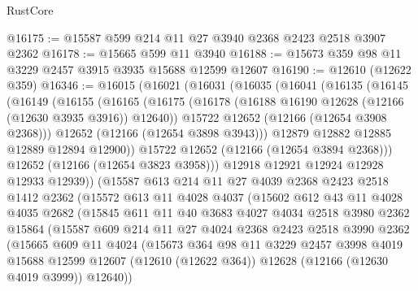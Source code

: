 \begin{lexlean}{RustCore}
\begin{coremodule}
@16175 := @15587 @599 @214 @11 @27 @3940 @2368 @2423 @2518 @3907 @2362
@16178 := @15665 @599 @11 @3940
@16188 := @15673 @359 @98 @11 @3229 @2457 @3915 @3935 @15688 @12599 @12607
@16190 := @12610 (@12622 @359)
@16346 := @16015
    (@16021
      (@16031
        (@16035
          (@16041
            (@16135
              (@16145
                (@16149
                  (@16155
                    (@16165
                      (@16175
                        (@16178 (@16188 @16190 @12628 (@12166 (@12630 @3935 @3916)) @12640))
                        @15722
                        @12652
                        (@12166 (@12654 @3908 @2368)))
                      @12652
                      (@12166 (@12654 @3898 @3943)))
                    @12879
                    @12882
                    @12885
                    @12889
                    @12894
                    @12900))
                @15722
                @12652
                (@12166 (@12654 @3894 @2368)))
              @12652
              (@12166 (@12654 @3823 @3958)))
            @12918
            @12921
            @12924
            @12928
            @12933
            @12939))
        (@15587
          @613
          @214
          @11
          @27
          @4039
          @2368
          @2423
          @2518
          @1412
          @2362
          (@15572
            @613
            @11
            @4028
            @4037
            (@15602
              @612
              @43
              @11
              @4028
              @4035
              @2682
              (@15845
                @611
                @11
                @40
                @3683
                @4027
                @4034
                @2518
                @3980
                @2362
                @15864
                (@15587
                  @609
                  @214
                  @11
                  @27
                  @4024
                  @2368
                  @2423
                  @2518
                  @3990
                  @2362
                  (@15665
                    @609
                    @11
                    @4024
                    (@15673
                      @364
                      @98
                      @11
                      @3229
                      @2457
                      @3998
                      @4019
                      @15688
                      @12599
                      @12607
                      (@12610 (@12622 @364))
                      @12628
                      (@12166 (@12630 @4019 @3999))
                      @12640))

\end{coremodule}
\end{lexlean}
